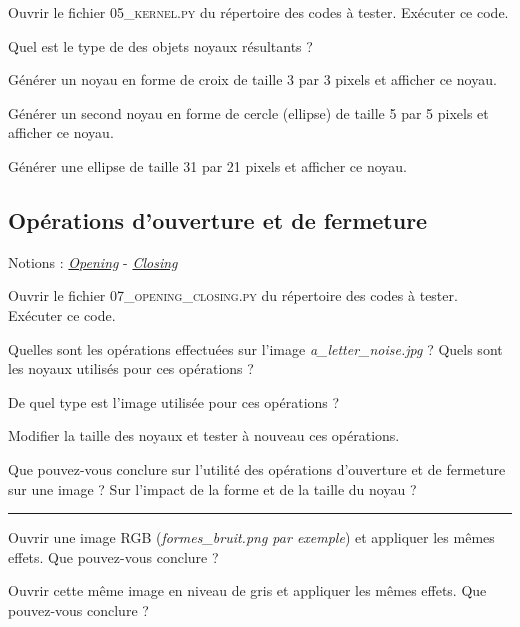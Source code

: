 \Manip Ouvrir le fichier \textsc{05\_kernel.py} du répertoire des codes à tester. Exécuter ce code.

\Quest Quel est le type de des objets noyaux résultants ?

\Manip Générer un noyau en forme de croix de taille 3 par 3 pixels et afficher ce noyau.

\Manip Générer un second noyau en forme de cercle (ellipse) de taille 5 par 5 pixels et afficher ce noyau.

\Manip Générer une ellipse de taille 31 par 21 pixels et afficher ce noyau.

\newpage
\subsection{Opérations d'ouverture et de fermeture}

\begin{mdframed}[style=sidebar,frametitle={}]
Notions : \href{https://iogs-lense-training.github.io/image-processing/contents/opencv_open_close.html#opening-operation}{\textit{Opening}} - \href{https://iogs-lense-training.github.io/image-processing/contents/opencv_open_close.html#closing-operation}{\textit{Closing}} 
\end{mdframed}

\Manip Ouvrir le fichier \textsc{07\_opening\_closing.py} du répertoire des codes à tester. Exécuter ce code.

\Quest Quelles sont les opérations effectuées sur l'image \textsl{a\_letter\_noise.jpg} ? Quels sont les noyaux utilisés pour ces opérations ?

\Quest De quel type est l'image utilisée pour ces opérations ?

\Manip Modifier la taille des noyaux et tester à nouveau ces opérations.

\Quest Que pouvez-vous conclure sur l'utilité des opérations d'ouverture et de fermeture sur une image ? Sur l'impact de la forme et de la taille du noyau ?


\noindent \rule{\linewidth}{1pt}

\Manip Ouvrir une image RGB (\textit{formes\_bruit.png par exemple}) et appliquer les mêmes effets. Que pouvez-vous conclure ?

\Manip Ouvrir cette même image en niveau de gris et appliquer les mêmes effets. Que pouvez-vous conclure ?

